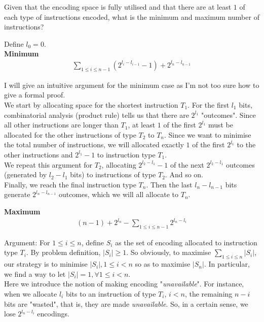 \documentclass{article}
\begin{document}
Given that the encoding space is fully utilised and that there are at least $1$ of each type of instructions encoded, what is the minimum and maximum number of instructions?

Define $l_0=0$.\\
\textbf{Minimum} 
\begin{align*}
	\sum_{1\leq i\leq n-1}(2^{l_i-l_{i-1}}-1) + 2^{l_n-l_{n-1}}
\end{align*}

I will give an intuitive argument for the minimum case as I'm not too sure how to give a formal proof.\\
We start by allocating space for the shortest instruction $T_1$. For the first $l_1$ bits, combinatorial analysis (product rule) tells us that there are $2^{l_1}$ "outcomes". Since all other instructions are longer than $T_1$, at least $1$ of the first $2^{l_1}$ must be allocated for the other instructions of type $T_2$ to $T_n$. Since we want to minimise the total number of instructions, we will allocated exactly $1$ of the first $2^{l_1}$ to the other instructions and $2^{l_1}-1$ to instruction type $T_1$.\\
We repeat this argument for $T_2$, allocating $2^{l_2-l_1}-1$ of the next $2^{l_2-l_1}$ outcomes (generated by $l_2-l_1$ bits) to instructions of type $T_2$. And so on.\\
Finally, we reach the final instruction type $T_n$. Then the last $l_n-l_{n-1}$ bits generate  $2^{l_n-l_{n-1}}$ outcomes, which we will all allocate to $T_n$.

\textbf{Maximum}
\begin{align*}
	(n-1) + 2^{l_n} - \sum_{1\leq i\leq n-1}2^{l_n-l_i}
\end{align*}

Argument: For $1\leq i\leq n$, define $S_i$ as the set of encoding allocated to instruction type $T_i$. By problem definition, $|S_i|\geq 1$. So obviously, to maximise $\sum_{1\leq i\leq n} |S_i|$, our strategy is to minimise $|S_i|, 1\leq i<n$ so as to maximise $|S_n|$. In particular, we find a way to let $|S_i|=1, \forall 1\leq i<n$.\\
Here we introduce the notion of making encoding "\textit{unavailable}". For instance, when we allocate $l_i$ bits to an instruction of type $T_i$, $i<n$, the remaining $n-i$ bits are "wasted", that is, they are made \textit{unavailable}. So, in a certain sense, we lose $2^{l_n-l_i}$ encodings.
\end{document}
